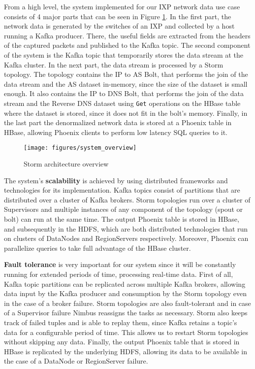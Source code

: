 From a high level, the system implemented for our IXP network data use case consists of 4 major parts that can be seen in Figure \ref{figure:system_overview}. In the first part, the network data is generated by the switches of an IXP and collected by a host running a Kafka producer. There, the useful fields are extracted from the headers of the captured packets and published to the Kafka topic. The second component of the system is the Kafka topic that temporarily stores the data stream at the Kafka cluster. In the next part, the data stream is processed by a Storm topology. The topology contains the IP to AS Bolt, that performs the join of the data stream and the AS dataset in-memory, since the size of the dataset is small enough. It also contains the IP to DNS Bolt, that performs the join of the data stream and the Reverse DNS dataset using \texttt{Get} operations on the HBase table where the dataset is stored, since it does not fit in the bolt's memory. Finally, in the last part the denormalized network data is stored at a Phoenix table in HBase, allowing Phoenix clients to perform low latency SQL queries to it.

\begin{figure}[H]
\centering
\texttt{[image: figures/system\_overview]}
\caption{Storm architecture overview}
\label{figure:system_overview}
\end{figure}

The system's \textbf{scalability} is achieved by using distributed frameworks and technologies for its implementation. Kafka topics consist of partitions that are distributed over a cluster of Kafka brokers. Storm topologies run over a cluster of Supervisors and multiple instances of any component of the topology (spout or bolt) can run at the same time. The output Phoenix table is stored in HBase, and subsequently in the HDFS, which are both distributed technologies that run on clusters of DataNodes and RegionServers respectively. Moreover, Phoenix can parallelize queries to take full advantage of the HBase cluster.

\textbf{Fault tolerance} is very important for our system since it will be constantly running for extended periods of time, processing real-time data. First of all, Kafka topic partitions can be replicated across multiple Kafka brokers, allowing data input by the Kafka producer and consumption by the Storm topology even in the case of a broker failure. Storm topologies are also fault-tolerant and in case of a Supervisor failure Nimbus reassigns the tasks as necessary. Storm also keeps track of failed tuples and is able to replay them, since Kafka retains a topic's data for a configurable period of time. This allows us to restart Storm topologies without skipping any data. Finally, the output Phoenix table that is stored in HBase is replicated by the underlying HDFS, allowing its data to be available in the case of a DataNode or RegionServer failure.

